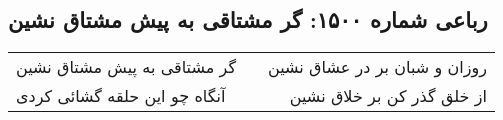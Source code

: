 \begin{center}
\section*{رباعی شماره ۱۵۰۰: گر مشتاقی به پیش مشتاق نشین}
\label{sec:1500}
\begin{longtable}{l p{0.5cm} r}
گر مشتاقی به پیش مشتاق نشین
&&
روزان و شبان بر در عشاق نشین
\\
آنگاه چو این حلقه گشائی کردی
&&
از خلق گذر کن بر خلاق نشین
\\
\end{longtable}
\end{center}
